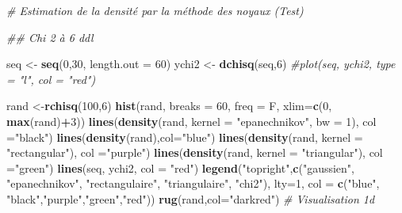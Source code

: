\documentclass[
]{book}
\newenvironment{Shaded}{\begin{snugshade}}{\end{snugshade}}
\newcommand{\CommentTok}[1]{\textcolor[rgb]{0.56,0.35,0.01}{\textit{#1}}}
\newcommand{\DataTypeTok}[1]{\textcolor[rgb]{0.13,0.29,0.53}{#1}}
\newcommand{\DecValTok}[1]{\textcolor[rgb]{0.00,0.00,0.81}{#1}}
\newcommand{\KeywordTok}[1]{\textcolor[rgb]{0.13,0.29,0.53}{\textbf{#1}}}
\newcommand{\NormalTok}[1]{#1}
\newcommand{\OperatorTok}[1]{\textcolor[rgb]{0.81,0.36,0.00}{\textbf{#1}}}
\newcommand{\StringTok}[1]{\textcolor[rgb]{0.31,0.60,0.02}{#1}}
\begin{document}
\begin{Shaded}
\begin{Highlighting}[]
\CommentTok{# Estimation de la densité par la méthode des noyaux (Test)}

\CommentTok{## Chi 2 à 6 ddl}

\NormalTok{seq <-}\StringTok{ }\KeywordTok{seq}\NormalTok{(}\DecValTok{0}\NormalTok{,}\DecValTok{30}\NormalTok{, }\DataTypeTok{length.out =} \DecValTok{60}\NormalTok{)}
\NormalTok{ychi2 <-}\StringTok{ }\KeywordTok{dchisq}\NormalTok{(seq,}\DecValTok{6}\NormalTok{)}
\CommentTok{#plot(seq, ychi2, type = "l", col = "red")}

\NormalTok{rand <-}\KeywordTok{rchisq}\NormalTok{(}\DecValTok{100}\NormalTok{,}\DecValTok{6}\NormalTok{)}
\KeywordTok{hist}\NormalTok{(rand, }\DataTypeTok{breaks =} \DecValTok{60}\NormalTok{, }\DataTypeTok{freq =}\NormalTok{ F, }\DataTypeTok{xlim=}\KeywordTok{c}\NormalTok{(}\DecValTok{0}\NormalTok{, }\KeywordTok{max}\NormalTok{(rand)}\OperatorTok{+}\DecValTok{3}\NormalTok{))}
\KeywordTok{lines}\NormalTok{(}\KeywordTok{density}\NormalTok{(rand, }\DataTypeTok{kernel =}  \StringTok{"epanechnikov"}\NormalTok{, }\DataTypeTok{bw =} \DecValTok{1}\NormalTok{), }\DataTypeTok{col =}\StringTok{"black"}\NormalTok{)}
\KeywordTok{lines}\NormalTok{(}\KeywordTok{density}\NormalTok{(rand),}\DataTypeTok{col=}\StringTok{"blue"}\NormalTok{)}
\KeywordTok{lines}\NormalTok{(}\KeywordTok{density}\NormalTok{(rand, }\DataTypeTok{kernel =}  \StringTok{"rectangular"}\NormalTok{), }\DataTypeTok{col =}\StringTok{"purple"}\NormalTok{)}
\KeywordTok{lines}\NormalTok{(}\KeywordTok{density}\NormalTok{(rand, }\DataTypeTok{kernel =}  \StringTok{"triangular"}\NormalTok{), }\DataTypeTok{col =}\StringTok{"green"}\NormalTok{)}
\KeywordTok{lines}\NormalTok{(seq, ychi2, }\DataTypeTok{col =} \StringTok{"red"}\NormalTok{)}
\KeywordTok{legend}\NormalTok{(}\StringTok{"topright"}\NormalTok{,}\KeywordTok{c}\NormalTok{(}\StringTok{"gaussien"}\NormalTok{, }\StringTok{"epanechnikov"}\NormalTok{, }\StringTok{"rectangulaire"}\NormalTok{, }\StringTok{"triangulaire"}\NormalTok{, }\StringTok{"chi2"}\NormalTok{),}
       \DataTypeTok{lty=}\DecValTok{1}\NormalTok{, }\DataTypeTok{col =} \KeywordTok{c}\NormalTok{(}\StringTok{"blue"}\NormalTok{, }\StringTok{"black"}\NormalTok{,}\StringTok{"purple"}\NormalTok{,}\StringTok{"green"}\NormalTok{,}\StringTok{"red"}\NormalTok{))}
\KeywordTok{rug}\NormalTok{(rand,}\DataTypeTok{col=}\StringTok{"darkred"}\NormalTok{) }\CommentTok{# Visualisation 1d}
\end{Highlighting}
\end{Shaded}
\end{document}
